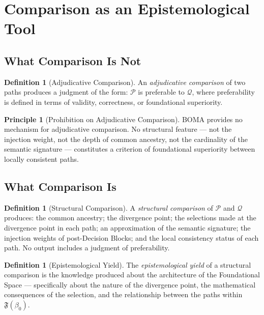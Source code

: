 \documentclass[12pt, a4paper]{article}
\theoremstyle{plain}
\theoremstyle{definition}
\newtheorem{definition}[theorem]{Definition}
\newtheorem{principle}[theorem]{Principle}
\theoremstyle{remark}
\newcommand{\FS}[1]{\mathfrak{F}(#1)}
\newcommand{\BOMA}{\textsf{BOMA}}
\begin{document}
\section{Comparison as an Epistemological Tool}
\label{sec:comparison}

\subsection{What Comparison Is Not}
\label{subsec:not-comparison}

\begin{definition}[Adjudicative Comparison]
\label{def:adjudicative}
An \emph{adjudicative comparison} of two paths produces a judgment of
the form: $\mathcal{P}$ is preferable to $\mathcal{Q}$, where
preferability is defined in terms of validity, correctness, or
foundational superiority.
\end{definition}

\begin{principle}[Prohibition on Adjudicative Comparison]
\label{prin:no-adjudication}
\BOMA{} provides no mechanism for adjudicative comparison. No
structural feature --- not the injection weight, not the depth of
common ancestry, not the cardinality of the semantic signature ---
constitutes a criterion of foundational superiority between locally
consistent paths.
\end{principle}

\subsection{What Comparison Is}
\label{subsec:what-comparison}

\begin{definition}[Structural Comparison]
\label{def:structural-comparison}
A \emph{structural comparison} of $\mathcal{P}$ and $\mathcal{Q}$
produces: the common ancestry; the divergence point; the selections
made at the divergence point in each path; an approximation of the
semantic signature; the injection weights of post-Decision Blocks;
and the local consistency status of each path. No output includes a
judgment of preferability.
\end{definition}

\begin{definition}[Epistemological Yield]
\label{def:yield}
The \emph{epistemological yield} of a structural comparison is the
knowledge produced about the architecture of the Foundational Space
--- specifically about the nature of the divergence point, the
mathematical consequences of the selection, and the relationship
between the paths within $\FS{\beta_0}$.
\end{definition}
\end{document}
